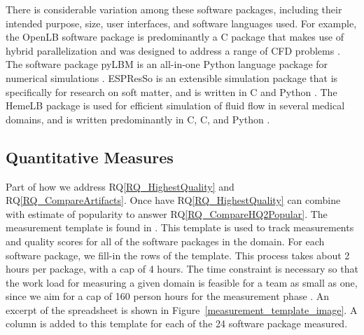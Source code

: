 \documentclass[final, 3p, times, authoryear]{elsarticle}
\newcommand{\CC}{C\nolinebreak\hspace{-.05em}\raisebox{.4ex}{\small\bf
+}\nolinebreak\hspace{-.10em}\raisebox{.4ex}{\small\bf +}}
\newcommand{\rqref}[1]{RQ\ref{#1}}
\begin{document}
There is considerable variation among these software packages, including their
intended purpose, size, user interfaces, and software languages used. For
example, the OpenLB software package is predominantly a \CC{} package that makes
use of hybrid parallelization and was designed to address a range of CFD
problems \citep{heuveline2009towards}. The software package pyLBM is an
all-in-one Python language package for numerical simulations
\citep{graille2017pylbm}. ESPResSo is an extensible simulation package that is
specifically for research on soft matter, and is written in \CC{} and Python
\citep{weik2019espresso}. The HemeLB package is used for efficient simulation of
fluid flow in several medical domains, and is written predominantly in C, \CC,
and Python \citep{mazzeo2008hemelb}.

\subsection{Quantitative Measures} \label{empiricalmeasures}

Part of how we address \rqref{RQ_HighestQuality} and
\rqref{RQ_CompareArtifacts}.  Once have \rqref{RQ_HighestQuality} can combine
with estimate of popularity to answer \rqref{RQ_CompareHQ2Popular}.  The
measurement template is found in \citet{SmithEtAl2021}.  This template is used
to track measurements and quality scores for all of the software packages in the
domain. For each software package, we fill-in the rows of the template. This
process takes about 2 hours per package, with a cap of 4 hours.  The time
constraint is necessary so that the work load for measuring a given domain is
feasible for a team as small as one, since we aim for a cap of 160 person hours
for the measurement phase \citet{SmithEtAl2021}.  An excerpt of the spreadsheet
is shown in Figure~\ref{measurement_template_image}.  A column is added to this
template for each of the 24 software package measured.
\end{document}
